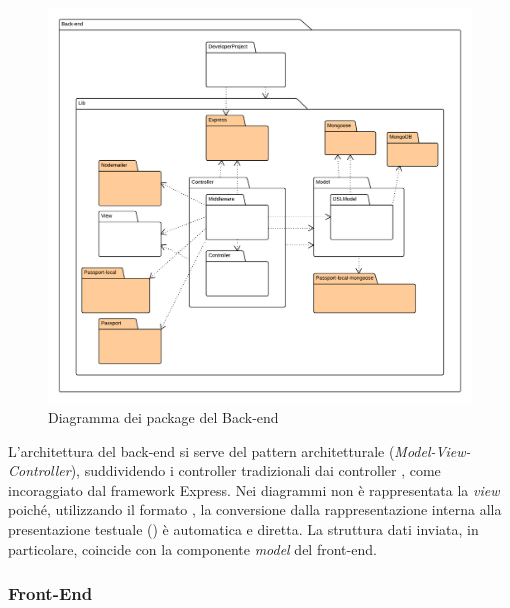 \begin{figure}[H]
\centering
\includegraphics[width=\textwidth]{uml/Back-end-Diagramma dei Packages.png}
\caption{Diagramma dei package del Back-end}
\end{figure}

L'architettura del back-end si serve del pattern architetturale  (\textit{Model-View-Controller}), suddividendo i controller tradizionali dai controller , come incoraggiato dal framework Express. Nei diagrammi non è rappresentata la \textit{view} poiché, utilizzando il formato , la conversione dalla rappresentazione interna alla presentazione testuale () è automatica e diretta. La struttura dati inviata, in particolare, coincide con la componente \textit{model} del front-end.

\subsubsection{Front-End}

